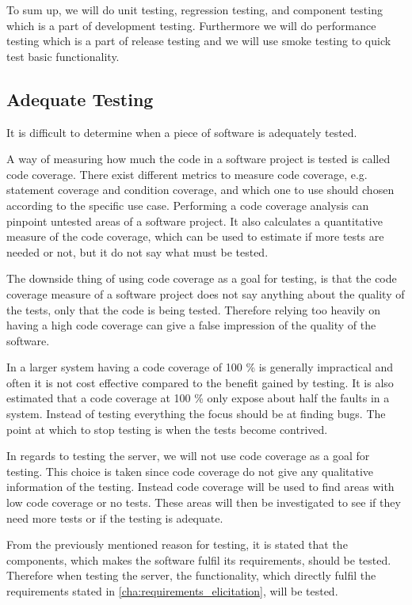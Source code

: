 To sum up, we will do unit testing, regression testing, and component testing which is a part of development testing. 
Furthermore we will do performance testing which is a part of release testing
and we will use smoke testing to quick test basic functionality.

\subsection{Adequate Testing}\label{subsec:adequate_testing}
It is difficult to determine when a piece of software is adequately tested.

A way of measuring how much the code in a software project is tested is called code coverage.
There exist different metrics to measure code coverage, e.g. statement coverage and condition coverage,
and which one to use should chosen according to the specific use case.
Performing a code coverage analysis can pinpoint untested areas of a software project.
It also calculates a quantitative measure of the code coverage, 
which can be used to estimate if more tests are needed or not, 
but it do not say what must be tested.\cite{code_coverage}

The downside thing of using code coverage as a goal for testing, 
is that the code coverage measure of a software project does not say anything about the quality of the tests, 
only that the code is being tested.
Therefore relying too heavily on having a high code coverage can give a false impression of the quality of the software.\cite{code_coverage_neg}

In a larger system having a code coverage of 100 \% is generally impractical and often it is not cost effective compared to the benefit gained by testing.
It is also estimated that a code coverage at 100 \% only expose about half the faults in a system.
Instead of testing everything the focus should be at finding bugs.
The point at which to stop testing is when the tests become contrived.\cite{code_coverage_not_100}

\bigskip

In regards to testing the server, we will not use code coverage as a goal for testing.
This choice is taken since code coverage do not give any qualitative information of the testing.
Instead code coverage will be used to find areas with low code coverage or no tests.
These areas will then be investigated to see if they need more tests or if the testing is adequate.

From the previously mentioned reason for testing, 
it is stated that the components, which makes the software fulfil its requirements, should be tested.
Therefore when testing the server, the functionality, 
which directly fulfil the requirements stated in \cref{cha:requirements_elicitation}, will be tested.

